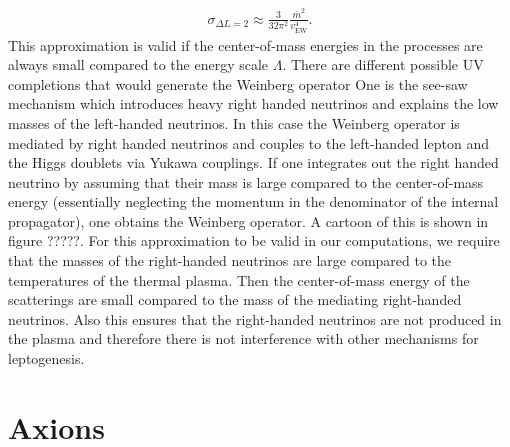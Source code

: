 \documentclass[13pt,a4paper,twoside,titlepage]{article}
\begin{document}
\begin{align}
    \sigma_{\Delta L = 2} \approx \frac{3}{32 \pi^2} \frac{\bar{m}^2}{v_{\mathrm{EW}}^4}.
\end{align}
This approximation is valid if the center-of-mass energies in the processes are always small compared to the energy scale $\Lambda$.
There are different possible UV completions that would generate the Weinberg operator
One is the see-saw mechanism which introduces heavy right handed neutrinos and explains the low masses of the left-handed neutrinos.
In this case the Weinberg operator is mediated by right handed neutrinos and
couples to the left-handed lepton and the Higgs doublets via Yukawa couplings.
If one integrates out the right handed neutrino by assuming that their mass is
large compared to the center-of-mass energy (essentially neglecting the momentum in the denominator of the internal propagator), one obtains the Weinberg operator.
A cartoon of this is shown in figure ?????.
For this approximation to be valid in our computations, we require that
the masses of the right-handed neutrinos are large compared to the temperatures
of the thermal plasma. Then the center-of-mass energy of the scatterings are
small compared to the mass of the mediating right-handed neutrinos.
Also this ensures that the right-handed neutrinos are not produced in the plasma and therefore there is not interference with other mechanisms for leptogenesis.











\section{Axions}
\label{sec:axions}
\end{document}
